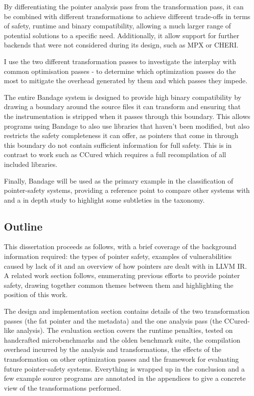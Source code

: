 \documentclass[a4paper,12pt,twoside,openright]{report}
\begin{document}
By differentiating the pointer analysis pass from the transformation pass, it can be combined with different transformations to achieve different trade-offs in terms of safety, runtime and binary compatibility, allowing a much larger range of potential solutions to a specific need.
Additionally, it allow support for further backends that were not considered during its design, such as MPX or CHERI.

I use the two different transformation passes to investigate the interplay with common optimisation passes - to determine which optimization passes do the most to mitigate the overhead generated by them and which passes they impede.

The entire Bandage system is designed to provide high binary compatibility by drawing a boundary around the source files it can transform and ensuring that the instrumentation is stripped when it passes through this boundary.
This allows programs using Bandage to also use libraries that haven't been modified, but also restricts the safety completeness it can offer, as pointers that come in through this boundary do not contain sufficient information for full safety.
This is in contrast to work such as CCured which requires a full recompilation of all included libraries.

Finally, Bandage will be used as the primary example in the classification of pointer-safety systems, providing a reference point to compare other systems with and a in depth study to highlight some subtleties in the taxonomy.

\subsection{Outline}

This dissertation proceeds as follows, with a brief coverage of the background information required: the types of pointer safety, examples of vulnerabilities caused by lack of it and an overview of how pointers are dealt with in LLVM IR.
A related work section follows, enumerating previous efforts to provide pointer safety, drawing together common themes between them and highlighting the position of this work.

The design and implementation section contains details of the two transformation passes (the fat pointer and the metadata) and the one analysis pass (the CCured-like analysis).
The evaluation section covers the runtime penalties, tested on handcrafted microbenchmarks and the olden benchmark suite, the compilation overhead incurred by the analysis and transformations, the effects of the transformation on other optimization passes and the framework for evaluating future pointer-safety systems.
Everything is wrapped up in the conclusion and a few example source programs are annotated in the appendices to give a concrete view of the transformations performed.
\end{document}
